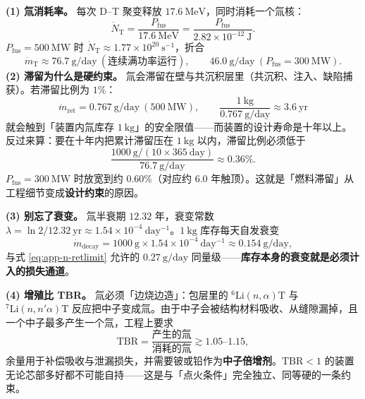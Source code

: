 \textbf{(1) 氚消耗率。} 每次 D--T 聚变释放 $17.6\ \mathrm{MeV}$，同时消耗一个氚核：
\begin{equation}
\dot{N}_{\mathrm{T}}=\frac{P_{\mathrm{fus}}}{17.6\ \mathrm{MeV}}
=\frac{P_{\mathrm{fus}}}{2.82\times10^{-12}\ \mathrm{J}}.
\end{equation}
$P_{\mathrm{fus}}=500\ \mathrm{MW}$ 时 $\dot{N}_{\mathrm{T}}\approx1.77\times10^{20}\ \mathrm{s^{-1}}$，折合
\begin{equation}
\dot{m}_{\mathrm{T}}\approx76.7\ \mathrm{g/day}\ (\text{连续满功率运行}),
\qquad
46.0\ \mathrm{g/day}\ (P_{\mathrm{fus}}=300\ \mathrm{MW}).
\label{eq:app-n-tburn}
\end{equation}
\textbf{(2) 滞留为什么是硬约束。} 氚会滞留在壁与共沉积层里（共沉积、注入、缺陷捕获）。若滞留比例为 $1\%$：
\begin{equation}
\dot{m}_{\mathrm{ret}}=0.767\ \mathrm{g/day}\ (500\ \mathrm{MW}),
\qquad
\frac{1\ \mathrm{kg}}{0.767\ \mathrm{g/day}}\approx3.6\ \mathrm{yr}
\end{equation}
就会触到「装置内氚库存 $1\ \mathrm{kg}$」的安全限值——而装置的设计寿命是十年以上。反过来算：要在十年内把累计滞留压在 $1\ \mathrm{kg}$ 以内，滞留比例必须低于
\begin{equation}
\frac{1000\ \mathrm{g}/(10\times365\ \mathrm{day})}{76.7\ \mathrm{g/day}}\approx0.36\%.
\label{eq:app-n-retlimit}
\end{equation}
$P_{\mathrm{fus}}=300\ \mathrm{MW}$ 时放宽到约 $0.60\%$（对应约 $6.0$ 年触顶）。这就是「燃料滞留」从工程细节变成\textbf{设计约束}的原因。

\textbf{(3) 别忘了衰变。} 氚半衰期 $12.32$ 年，衰变常数 $\lambda=\ln2/12.32\ \mathrm{yr}\approx1.54\times10^{-4}\ \mathrm{day^{-1}}$。$1\ \mathrm{kg}$ 库存每天自发衰变
\begin{equation}
\dot{m}_{\mathrm{decay}}=1000\ \mathrm{g}\times1.54\times10^{-4}\ \mathrm{day^{-1}}\approx0.154\ \mathrm{g/day},
\end{equation}
与式 \eqref{eq:app-n-retlimit} 允许的 $0.27\ \mathrm{g/day}$ 同量级——\textbf{库存本身的衰变就是必须计入的损失通道}。

\textbf{(4) 增殖比 TBR。} 氚必须「边烧边造」：包层里的 $^{6}\mathrm{Li}(n,\alpha)\mathrm{T}$ 与 $^{7}\mathrm{Li}(n,n'\alpha)\mathrm{T}$ 反应把中子变成氚。由于中子会被结构材料吸收、从缝隙漏掉，且一个中子最多产生一个氚，工程上要求
\begin{equation}
\mathrm{TBR}=\frac{\text{产生的氚}}{\text{消耗的氚}}\gtrsim1.05\text{--}1.15,
\end{equation}
余量用于补偿吸收与泄漏损失，并需要铍或铅作为\textbf{中子倍增剂}。$\mathrm{TBR}<1$ 的装置无论芯部多好都不可能自持——这是与「点火条件」完全独立、同等硬的一条约束。


